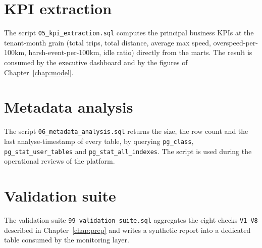 \section{KPI extraction}
\label{sec:app-sql-kpi}
The script \texttt{05\_kpi\_extraction.sql} computes the principal business KPIs at the tenant-month grain (total trips, total distance, average max speed, overspeed-per-100km, harsh-event-per-100km, idle ratio) directly from the marts. The result is consumed by the executive dashboard and by the figures of Chapter~\ref{chap:model}.

\section{Metadata analysis}
\label{sec:app-sql-meta}
The script \texttt{06\_metadata\_analysis.sql} returns the size, the row count and the last analyse-timestamp of every table, by querying \texttt{pg\_class}, \texttt{pg\_stat\_user\_tables} and \texttt{pg\_stat\_all\_indexes}. The script is used during the operational reviews of the platform.

\section{Validation suite}
The validation suite \texttt{99\_validation\_suite.sql} aggregates the eight checks \texttt{V1}--\texttt{V8} described in Chapter~\ref{chap:prep} and writes a synthetic report into a dedicated table consumed by the monitoring layer.

\cleardoublepage
